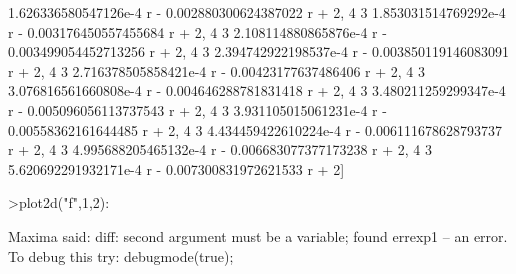 \documentclass[12pt,arial,letterpaper]{book}
\begin{document}
\begin{eulercomment}
\begin{eulercomment}
\begin{eulercomment}
\begin{eulercomment}
\begin{eulercomment}
\begin{eulercomment}
\begin{eulercomment}
\begin{eulercomment}
\begin{eulercomment}
\begin{eulercomment}
\begin{eulercomment}
\begin{eulercomment}
\begin{eulercomment}
\begin{eulercomment}
\begin{eulercomment}
\begin{eulercomment}
\begin{eulercomment}
\begin{eulercomment}
\begin{eulercomment}
\begin{eulercomment}
\begin{eulercomment}
\begin{eulercomment}
\begin{euleroutput}
  1.626336580547126e-4 r  - 0.002880300624387022 r  + 2, 
                        4                         3
  1.853031514769292e-4 r  - 0.003176450557455684 r  + 2, 
                        4                         3
  2.108114880865876e-4 r  - 0.003499054452713256 r  + 2, 
                        4                         3
  2.394742922198537e-4 r  - 0.003850119146083091 r  + 2, 
                        4                        3
  2.716378505858421e-4 r  - 0.00423177637486406 r  + 2, 
                        4                         3
  3.076816561660808e-4 r  - 0.004646288781831418 r  + 2, 
                        4                         3
  3.480211259299347e-4 r  - 0.005096056113737543 r  + 2, 
                        4                        3
  3.931105015061231e-4 r  - 0.00558362161644485 r  + 2, 
                        4                         3
  4.434459422610224e-4 r  - 0.006111678628793737 r  + 2, 
                        4                         3
  4.995688205465132e-4 r  - 0.006683077377173238 r  + 2, 
                        4                         3
  5.620692291932171e-4 r  - 0.007300831972621533 r  + 2]
  
\end{euleroutput}
\begin{eulerprompt}
>plot2d("f",1,2):
\end{eulerprompt}
\begin{euleroutput}
  Maxima said:
  diff: second argument must be a variable; found errexp1
   -- an error. To debug this try: debugmode(true);
  

\end{euleroutput}
\end{eulercomment}
\end{eulercomment}
\end{eulercomment}
\end{eulercomment}
\end{eulercomment}
\end{eulercomment}
\end{eulercomment}
\end{eulercomment}
\end{eulercomment}
\end{eulercomment}
\end{eulercomment}
\end{eulercomment}
\end{eulercomment}
\end{eulercomment}
\end{eulercomment}
\end{eulercomment}
\end{eulercomment}
\end{eulercomment}
\end{eulercomment}
\end{eulercomment}
\end{eulercomment}
\end{eulercomment}
\end{document}
